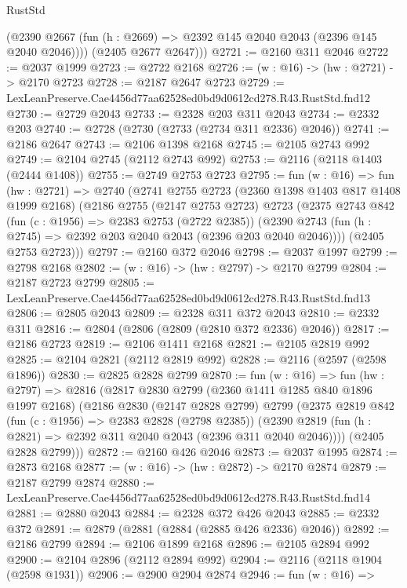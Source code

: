 \begin{lexlean}{RustStd}
\begin{coremodule}
          (@2390 @2667 (fun (h : @2669) => @2392 @145 @2040 @2043 (@2396 @145 @2040 @2046))))
        (@2405 @2677 @2647)))
@2721 := @2160 @311 @2046
@2722 := @2037 @1999
@2723 := @2722 @2168
@2726 := (w : @16) -> (hw : @2721) -> @2170 @2723
@2728 := @2187 @2647 @2723
@2729 := LexLeanPreserve.Cae4456d77aa62528ed0bd9d0612cd278.R43.RustStd.fnd12
@2730 := @2729 @2043
@2733 := @2328 @203 @311 @2043
@2734 := @2332 @203
@2740 := @2728 (@2730 (@2733 (@2734 @311 @2336) @2046))
@2741 := @2186 @2647
@2743 := @2106 @1398 @2168
@2745 := @2105 @2743 @992
@2749 := @2104 @2745 (@2112 @2743 @992)
@2753 := @2116 (@2118 @1403 (@2444 @1408))
@2755 := @2749 @2753 @2723
@2795 := fun (w : @16) =>
  fun (hw : @2721) =>
  @2740
    (@2741
      @2755
      @2723
      (@2360 @1398 @1403 @817 @1408 @1999 @2168)
      (@2186
        @2755
        (@2147 @2753 @2723)
        @2723
        (@2375
          @2743
          @842
          (fun (c : @1956) => @2383 @2753 (@2722 @2385))
          (@2390 @2743 (fun (h : @2745) => @2392 @203 @2040 @2043 (@2396 @203 @2040 @2046))))
        (@2405 @2753 @2723)))
@2797 := @2160 @372 @2046
@2798 := @2037 @1997
@2799 := @2798 @2168
@2802 := (w : @16) -> (hw : @2797) -> @2170 @2799
@2804 := @2187 @2723 @2799
@2805 := LexLeanPreserve.Cae4456d77aa62528ed0bd9d0612cd278.R43.RustStd.fnd13
@2806 := @2805 @2043
@2809 := @2328 @311 @372 @2043
@2810 := @2332 @311
@2816 := @2804 (@2806 (@2809 (@2810 @372 @2336) @2046))
@2817 := @2186 @2723
@2819 := @2106 @1411 @2168
@2821 := @2105 @2819 @992
@2825 := @2104 @2821 (@2112 @2819 @992)
@2828 := @2116 (@2597 (@2598 @1896))
@2830 := @2825 @2828 @2799
@2870 := fun (w : @16) =>
  fun (hw : @2797) =>
  @2816
    (@2817
      @2830
      @2799
      (@2360 @1411 @1285 @840 @1896 @1997 @2168)
      (@2186
        @2830
        (@2147 @2828 @2799)
        @2799
        (@2375
          @2819
          @842
          (fun (c : @1956) => @2383 @2828 (@2798 @2385))
          (@2390 @2819 (fun (h : @2821) => @2392 @311 @2040 @2043 (@2396 @311 @2040 @2046))))
        (@2405 @2828 @2799)))
@2872 := @2160 @426 @2046
@2873 := @2037 @1995
@2874 := @2873 @2168
@2877 := (w : @16) -> (hw : @2872) -> @2170 @2874
@2879 := @2187 @2799 @2874
@2880 := LexLeanPreserve.Cae4456d77aa62528ed0bd9d0612cd278.R43.RustStd.fnd14
@2881 := @2880 @2043
@2884 := @2328 @372 @426 @2043
@2885 := @2332 @372
@2891 := @2879 (@2881 (@2884 (@2885 @426 @2336) @2046))
@2892 := @2186 @2799
@2894 := @2106 @1899 @2168
@2896 := @2105 @2894 @992
@2900 := @2104 @2896 (@2112 @2894 @992)
@2904 := @2116 (@2118 @1904 (@2598 @1931))
@2906 := @2900 @2904 @2874
@2946 := fun (w : @16) =>

\end{coremodule}
\end{lexlean}
